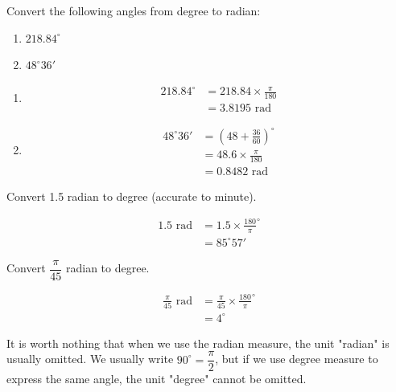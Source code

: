 \documentclass{report}
\begin{document}
\begin{question}
	Convert the following angles from degree to radian:
	\vspace{-1em}
	\begin{multicols}{2}
		\begin{enumerate}[label=(\alph*)]
			\item $218.84^\circ$
			\item $48^\circ 36'$
		\end{enumerate}
	\end{multicols}
	\vspace{-1em}
	\sol{}
	\begin{enumerate}[label=(\alph*)]
		\item \begin{align*}
		      218.84^\circ &= 218.84 \times \frac{\pi}{180}\\
		      &= 3.8195 \text{ rad}
		\end{align*}
		\item \begin{align*}
		      48^\circ 36' &= \left(48 + \frac{36}{60}\right)^{\circ}\\
		      & = 48.6 \times \frac{\pi}{180}\\
		      & = 0.8482 \text{ rad}
		\end{align*}
	\end{enumerate}
\end{question}

\begin{question}
	Convert 1.5 radian to degree (accurate to minute).
	
	\sol{}
	\begin{align*}
		1.5 \text{ rad} & = 1.5 \times \frac{180}{\pi}^\circ \\
		                & = 85^\circ 57'                     
	\end{align*}
\end{question}

\begin{question}
	Convert $\dfrac{\pi}{45}$ radian to degree.
	
	\sol{}
	\begin{align*}
		\frac{\pi}{45} \text{ rad} & = \frac{\pi}{45} \times \frac{180}{\pi}^\circ \\
		                           & = 4^\circ                                     
	\end{align*}
\end{question}

It is worth nothing that when we use the radian measure, the unit "radian" is usually omitted. We usually write $90^\circ = \dfrac{\pi}{2}$, but if we use degree measure to express the same angle, the unit "degree" cannot be omitted.
\end{document}
